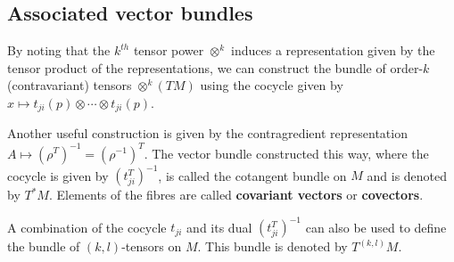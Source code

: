 
\subsection{Associated vector bundles}


    \begin{example}
        By noting that the $k^{th}$ tensor power $\otimes^k$ induces a representation given by the tensor product of the representations, we can construct the bundle of order-$k$ (contravariant) tensors $\otimes^k(TM)$ using the cocycle given by $x\mapsto t_{ji}(p)\otimes\cdots\otimes t_{ji}(p)$.
    \end{example}
    \begin{example}\label{manifolds:cotangent_bundle}
        Another useful construction is given by the contragredient representation $A\mapsto (\rho^T)^{-1}=(\rho^{-1})^T$. The vector bundle constructed this way, where the cocycle is given by $(t_{ji}^T)^{-1}$, is called the cotangent bundle on $M$ and is denoted by $T^*M$. Elements of the fibres are called \textbf{covariant vectors} or \textbf{covectors}.
    \end{example}
    \begin{notation}
        A combination of the cocycle $t_{ji}$ and its dual $(t_{ji}^T)^{-1}$ can also be used to define the bundle of $(k, l)$-tensors on $M$. This bundle is denoted by $T^{(k, l)}M$.
    \end{notation}

